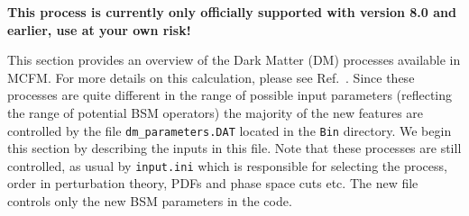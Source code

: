 
\textbf{This process is currently only officially supported with version 8.0 and earlier, use at your own risk!}

This section provides an overview of the Dark Matter (DM) processes
available in MCFM. For more details on this calculation, please see Ref.~\cite{Fox:2012ru}.
Since these processes are quite different in the
range of possible input parameters (reflecting the range of potential
BSM operators) the majority of the new features are controlled by the
file {\tt dm\_parameters.DAT} located in the {\tt Bin} directory.  We
begin this section by describing the inputs in this file.  Note that
these processes are still controlled, as usual by {\tt input.ini}
which is responsible for selecting the process, order in perturbation
theory, PDFs and phase space cuts etc. The new file controls only the
new BSM parameters in the code.

